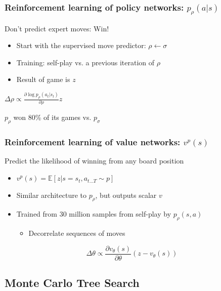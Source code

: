 \documentclass{beamer}
\begin{document}
\begin{frame}
  \frametitle{Reinforcement learning of policy networks: $p_\rho(a|s)$}
  Don't predict expert moves: Win!
  \begin{itemize}
  \item Start with the supervised move predictor: $\rho \leftarrow \sigma$
  \item Training: self-play vs. a previous iteration of $\rho$
  \item Result of game is $z$
  \end{itemize}
  \begin{tcolorbox}
    \begin{center}
      $\Delta \rho \propto \frac{\partial \log p_\rho(a_t|s_t)}{\partial \rho}z$
    \end{center}
  \end{tcolorbox}
  $p_\rho$ won 80\% of its games vs. $p_\sigma$
\end{frame}


\begin{frame}
  \frametitle{Reinforcement learning of value networks: $v^p(s)$}
  Predict the likelihood of winning from any board position
  \begin{itemize}
  \item $v^p(s) = \mathbb{E}\left[ z | s = s_t, a_{t\ldots T} \sim p\right]$
  \item Similar architecture to $p_\rho$, but outputs scalar $v$
  \item Trained from 30 million samples from self-play by $p_\rho(s,a)$
    \begin{itemize}
    \item Decorrelate sequences of moves
    \end{itemize}
  \end{itemize}
  \begin{tcolorbox}
    \begin{equation*}
      \Delta \theta \propto \frac{\partial v_\theta(s)}{\partial \theta}(z-v_\theta(s))
    \end{equation*}
  \end{tcolorbox}
\end{frame}




\subsection{Monte Carlo Tree Search}
\end{document}

